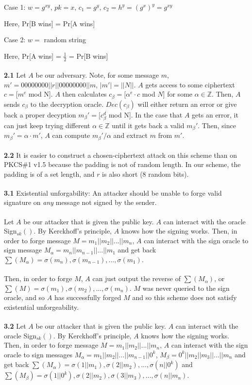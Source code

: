 \documentclass[12pt]{article}
\begin{document}
Case 1: $w = g^{xy}$, $pk = x$, $c_1 = g^y$, $c_2 = h^y = (g^x)^y = g^{xy}$

Here, Pr[B wins] = Pr[A wins]

Case 2: $w =$ random string

Here, Pr[A wins] = $\frac{1}{2}$ = Pr[B wins]
\\
\\
\noindent \textbf{2.1} Let $A$ be our adversary. Note, for some message $m$, $m' = 00000000||r||00000000||m$, $|m'| = ||N||$. $A$ gets access to some ciphertext $c = [m^e$ mod N]. $A$ then calculates $c_\beta = [\alpha^e \cdot c$ mod $N$] for some $\alpha \in \mathbb{Z}$. Then, $A$ sends $c_\beta$ to the decryption oracle. $Dec(c_\beta)$ will either return an error or give back a proper decyption $m_\beta' = [c_\beta^d$ mod N]. In the case that $A$ gets an error, it can just keep trying different $\alpha \in \mathbb{Z}$ until it gets back a valid $m_\beta'$. Then, since $m_\beta' = \alpha \cdot m'$, $A$ can compute $m_\beta'/\alpha$ and extract $m$ from $m'$.
\\
\\
\noindent \textbf{2.2} It is easier to construct a chosen-ciphertext attack on this scheme than on PKCS\#1 v1.5 because the padding is not of random length. In our scheme, the padding is of a set length, and $r$ is also short (8 random bits).
\\
\\
\noindent \textbf{3.1} Existential unforgability: An attacker should be unable to forge valid signature on \emph{any} message not signed by the sender.
\\
\\
Let $A$ be our attacker that is given the public key. $A$ can interact with the oracle Sign$_{sk}()$. By Kerckhoff's principle, $A$ knows how the signing works. Then, in order to forge message $M = m_1||m_2||...||m_n$, $A$ can interact with the sign oracle to sign message $M_\alpha = m_n||m_{n-1}||...||m_1$ and get back $\sum(M_\alpha) = \sigma(m_n),\sigma(m_{n-1}),...,\sigma(m_1)$. 
\\
\\Then, in order to forge $M$, $A$ can just output the reverse of $\sum(M_\alpha)$, or $\sum(M) = \sigma(m_1),\sigma(m_{2}),...,\sigma(m_n)$. $M$ was never queried to the sign oracle, and so $A$ has successfully forged $M$ and so this scheme does not satisfy existential unforgeability.
\\
\\
\noindent \textbf{3.2} Let $A$ be our attacker that is given the public key. $A$ can interact with the oracle Sign$_{sk}()$. By Kerckhoff's principle, $A$ knows how the signing works. Then, in order to forge message $M = m_1||m_2||...||m_n$, $A$ can interact with the sign oracle to sign messages $M_\alpha = m_1||m_2||...||m_{n-1}||0^k$, $M_\beta = 0^k||m_2||m_3||...||m_n$ and get back $\sum(M_\alpha) = \sigma(1||m_1),\sigma(2||m_2),...,\sigma(n||0^k)$ and $\sum(M_\beta) = \sigma(1||0^k),\sigma(2||m_2),\sigma(3||m_3),...,\sigma(n||m_n)$. 
\end{document}
